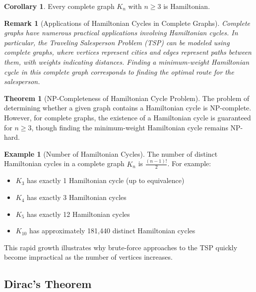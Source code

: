\documentclass{article}
\newtheorem{remark}{Remark}
\theoremstyle{definition}
\newtheorem{example}{Example}
\newtheorem{theorem}{Theorem}
\newtheorem{corollary}{Corollary}
\begin{document}
\begin{corollary}
Every complete graph $K_n$ with $n \geq 3$ is Hamiltonian.
\end{corollary}
\begin{remark}[Applications of Hamiltonian Cycles in Complete Graphs]
Complete graphs have numerous practical applications involving Hamiltonian cycles. In particular, the Traveling Salesperson Problem (TSP) can be modeled using complete graphs, where vertices represent cities and edges represent paths between them, with weights indicating distances. Finding a minimum-weight Hamiltonian cycle in this complete graph corresponds to finding the optimal route for the salesperson.
\end{remark}


\begin{theorem}[NP-Completeness of Hamiltonian Cycle Problem]
The problem of determining whether a given graph contains a Hamiltonian cycle is NP-complete. However, for complete graphs, the existence of a Hamiltonian cycle is guaranteed for $n \geq 3$, though finding the minimum-weight Hamiltonian cycle remains NP-hard.
\end{theorem}

\begin{example}[Number of Hamiltonian Cycles]
The number of distinct Hamiltonian cycles in a complete graph $K_n$ is $\frac{(n-1)!}{2}$. For example:
\begin{itemize}
    \item $K_3$ has exactly 1 Hamiltonian cycle (up to equivalence)
    \item $K_4$ has exactly 3 Hamiltonian cycles
    \item $K_5$ has exactly 12 Hamiltonian cycles
    \item $K_{10}$ has approximately 181,440 distinct Hamiltonian cycles
\end{itemize}
This rapid growth illustrates why brute-force approaches to the TSP quickly become impractical as the number of vertices increases.
\end{example}
\subsection{Dirac's Theorem}
\end{document}
